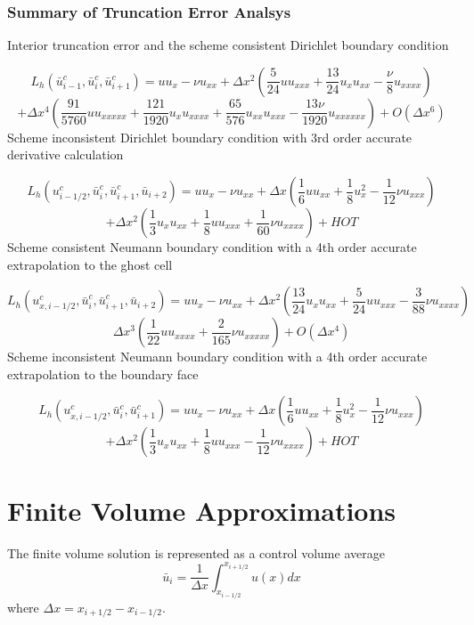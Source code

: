 \documentclass[10pt]{article}%
\begin{document}
\subsubsection{Summary of Truncation Error Analsys}

Interior truncation error and the scheme consistent Dirichlet boundary condition

\[
  L_h(\bar u^c_{i-1},\bar u^c_{i},\bar u^c_{i+1}) = u u_x - \nu u_{xx}
                                    + \Delta x^2\left( \frac{5}{24}u u_{xxx} + \frac{13}{24}u_x u_{xx} - \frac{\nu}{8} u_{xxxx} \right)
\]
\[
                                    + \Delta x^4\left( \frac{91}{5760}u u_{xxxxx} + \frac{121}{1920} u_x u_{xxxx} + \frac{65}{576}u_{xx}u_{xxx} - \frac{13\nu}{1920} u_{xxxxxx} \right)
                                    + O(\Delta x^6)
\]
Scheme inconsistent Dirichlet boundary condition with 3rd order accurate derivative calculation

\[
  L_h(u_{i-1/2}^c,\bar u_{i}^c,\bar u_{i+1}^c, \bar u_{i+2})
  = u u_x - \nu u_{xx} + \Delta x \left( \frac{1}{6} u u_{xx} +\frac{1}{8} u_x^2 - \frac{1}{12}\nu u_{xxx} \right)
\]
\[
    + \Delta x^2 \left( \frac{1}{3} u_x u_{xx} + \frac{1}{8} u u_{xxx} + \frac{1}{60}\nu u_{xxxx} \right)
    + HOT
\]
Scheme consistent Neumann boundary condition with a 4th order accurate extrapolation to the ghost cell

\[
  L_h(u_{x,i-1/2}^c,\bar u_{i}^c,\bar u_{i+1}^c, \bar u_{i+2})
  = u u_x - \nu u_{xx} 
    + \Delta x^2 \left( \frac{13}{24} u_x u_{xx} 
                      + \frac{5}{24} u u_{xxx} 
                      - \frac{3}{88}\nu u_{xxxx}
                 \right)
\]
\[
     \Delta x^3 \left(
                       \frac{1}{22} u u_{xxxx} 
                     + \frac{2}{165}\nu u_{xxxxx}
                \right)
    + O(\Delta x^4)
\]
Scheme inconsistent Neumann boundary condition with a 4th order accurate extrapolation to the boundary face

\[
  L_h(u_{x,i-1/2}^c,\bar u_{i}^c,\bar u_{i+1}^c)
  = u u_x - \nu u_{xx} 
  + \Delta x \left( \frac{1}{6} u u_{xx} + \frac{1}{8} u_{x}^2 - \frac{1}{12}\nu u_{xxx} \right)
\]
\[
    + \Delta x^2 \left( \frac{1}{3} u_x u_{xx} 
                      + \frac{1}{8} u u_{xxx} 
                      - \frac{1}{12}\nu u_{xxxx}
                 \right)
    + HOT
\]


\section{Finite Volume Approximations}
The finite volume solution is represented as a control volume average
\[
  \bar u_i = \frac{1}{\Delta x } \int_{x_{i-1/2}}^{x_{i+1/2}} u(x) dx
\]
where $\Delta x = x_{i+1/2}-x_{i-1/2}$.
\end{document}
